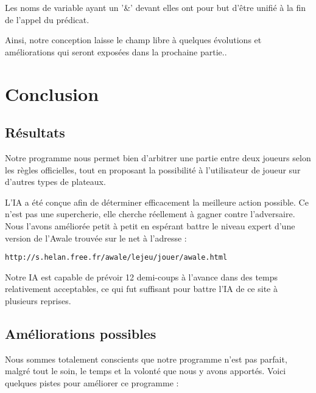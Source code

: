 \documentclass[]{article}
\begin{document}
Les noms de variable ayant un '\&' devant elles ont pour but d'être unifié à la fin de l'appel du prédicat.
	
Ainsi, notre conception laisse le champ libre à quelques évolutions et améliorations qui seront exposées dans la prochaine partie..

\section{Conclusion}

\subsection{Résultats}
Notre programme nous permet bien d'arbitrer une partie entre deux joueurs selon les règles officielles, tout en proposant la possibilité à l'utilisateur de joueur sur d'autres types de plateaux.

L'IA a été conçue afin de déterminer efficacement la meilleure action possible. Ce n'est pas une supercherie, elle cherche réellement à gagner contre l'adversaire. Nous l'avons améliorée petit à petit en espérant battre le niveau expert d'une version de l'Awale trouvée sur le net à l'adresse :
\begin{verbatim}
http://s.helan.free.fr/awale/lejeu/jouer/awale.html
\end{verbatim}

Notre IA est capable de prévoir 12 demi-coups à l'avance dans des temps relativement acceptables, ce qui fut suffisant pour battre l'IA de ce site à plusieurs reprises.


\subsection{Améliorations possibles}

Nous sommes totalement conscients que notre programme n'est pas parfait, malgré tout le soin, le temps et la volonté que nous y avons apportés. Voici quelques pistes pour améliorer ce programme : 
\end{document}
